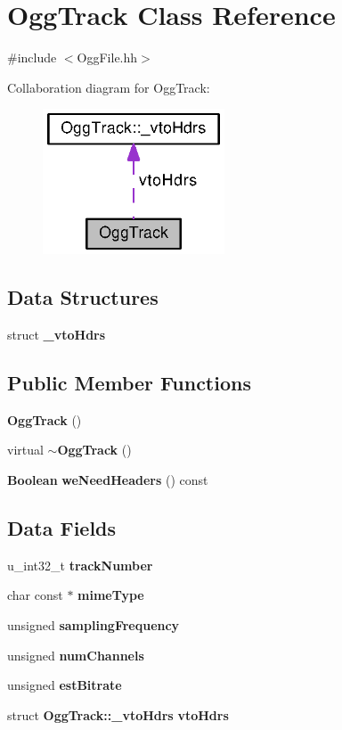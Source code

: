 \section{Ogg\+Track Class Reference}
\label{classOggTrack}


{\ttfamily \#include $<$Ogg\+File.\+hh$>$}



Collaboration diagram for Ogg\+Track\+:
\nopagebreak
\begin{figure}[H]
\begin{center}
\leavevmode
\includegraphics[width=153pt]{classOggTrack__coll__graph}
\end{center}
\end{figure}
\subsection*{Data Structures}
\begin{DoxyCompactItemize}
\item 
struct {\bf \+\_\+vto\+Hdrs}
\end{DoxyCompactItemize}
\subsection*{Public Member Functions}
\begin{DoxyCompactItemize}
\item 
{\bf Ogg\+Track} ()
\item 
virtual {\bf $\sim$\+Ogg\+Track} ()
\item 
{\bf Boolean} {\bf we\+Need\+Headers} () const 
\end{DoxyCompactItemize}
\subsection*{Data Fields}
\begin{DoxyCompactItemize}
\item 
u\+\_\+int32\+\_\+t {\bf track\+Number}
\item 
char const $\ast$ {\bf mime\+Type}
\item 
unsigned {\bf sampling\+Frequency}
\item 
unsigned {\bf num\+Channels}
\item 
unsigned {\bf est\+Bitrate}
\item 
struct {\bf Ogg\+Track\+::\+\_\+vto\+Hdrs} {\bf vto\+Hdrs}
\end{DoxyCompactItemize}


